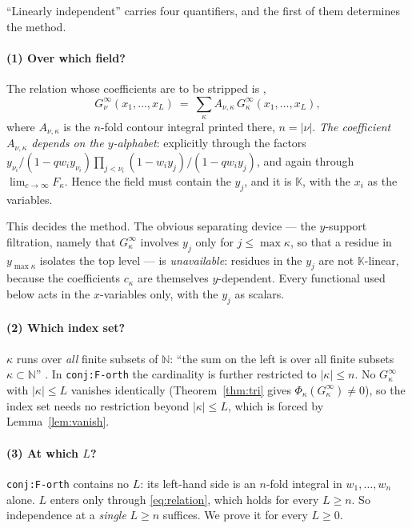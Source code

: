 \documentclass[11pt]{article}
\theoremstyle{definition}
\theoremstyle{remark}
\newcommand{\NN}{\mathbb{N}}
\newcommand{\KK}{\mathbb{K}}
\newcommand{\Gi}[1]{G^{\infty}_{#1}}
\begin{document}
``Linearly independent'' carries four quantifiers, and the first of them determines the method.

\paragraph{(1) Over which field?}
The relation whose coefficients are to be stripped is \cite[\texttt{eq: G nu integral forumla
thm-cinf2}, line 3857]{GDMW},
\begin{equation}\label{eq:relation}
  \Gi{\nu}(x_1,\dots,x_L)\ =\ \sum_{\kappa} A_{\nu,\kappa}\,\Gi{\kappa}(x_1,\dots,x_L),
\end{equation}
where $A_{\nu,\kappa}$ is the $n$-fold contour integral printed there, $n=|\nu|$. \emph{The
coefficient $A_{\nu,\kappa}$ depends on the $y$-alphabet}: explicitly through the factors
$y_{\nu_i}/(1-qw_iy_{\nu_i})\prod_{j<\nu_i}(1-w_iy_j)/(1-qw_iy_j)$, and again through
$\lim_{c\to\infty}F_\kappa$. Hence the field must contain the $y_j$, and it is $\KK$, with the
$x_i$ as the variables.

This decides the method. The obvious separating device --- the $y$-support filtration, namely
that $\Gi\kappa$ involves $y_j$ only for $j\le\max\kappa$, so that a residue in
$y_{\max\kappa}$ isolates the top level --- is \emph{unavailable}: residues in the $y_j$ are not
$\KK$-linear, because the coefficients $c_\kappa$ are themselves $y$-dependent. Every functional
used below acts in the $x$-variables only, with the $y_j$ as scalars.

\paragraph{(2) Which index set?}
$\kappa$ runs over \emph{all} finite subsets of $\NN$: ``the sum on the left is over all finite
subsets $\kappa\subset\NN$'' \cite[line 443]{GDMW}. In \texttt{conj:F-orth} the cardinality is
further restricted to $|\kappa|\le n$. No $\Gi\kappa$ with $|\kappa|\le L$ vanishes
identically (Theorem~\ref{thm:tri} gives $\Phi_\kappa(\Gi\kappa)\ne0$), so the index set needs
no restriction beyond $|\kappa|\le L$, which is forced by Lemma~\ref{lem:vanish}.

\paragraph{(3) At which $L$?}
\texttt{conj:F-orth} contains no $L$: its left-hand side is an $n$-fold integral in
$w_1,\dots,w_n$ alone. $L$ enters only through \eqref{eq:relation}, which holds for every
$L\ge n$. So independence at a \emph{single} $L\ge n$ suffices. We prove it for every $L\ge0$.
\end{document}
